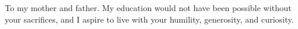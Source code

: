 
\noindent To my mother and father. 
My education would not have been possible without your sacrifices, and I aspire to live with your humility, generosity, and curiosity.
